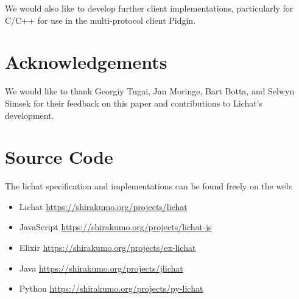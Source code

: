 \documentclass[format=sigconf]{acmart}
\begin{document}
We would also like to develop further client implementations, particularly for C/C++ for use in the multi-protocol client Pidgin.

\section{Acknowledgements}\label{acknowledgements}
We would like to thank Georgiy Tugai, Jan Moringe, Bart Botta, and Selwyn Simsek for their feedback on this paper and contributions to Lichat's development.

\section{Source Code}\label{source}
The lichat specification and implementations can be found freely on the web:
\begin{itemize}
\item Lichat \url{https://shirakumo.org/projects/lichat}
\item JavaScript \url{https://shirakumo.org/projects/lichat-js}
\item Elixir \url{https://shirakumo.org/projects/ex-lichat}
\item Java \url{https://shirakumo.org/projects/jlichat}
\item Python \url{https://shirakumo.org/projects/py-lichat}
\end{itemize}


\end{document}
